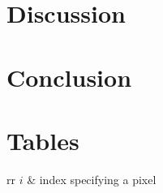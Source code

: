 \documentclass[iop,floatfix]{emulateapj}
\newcommand{\vt}{ {\bm \theta}}
\newcommand{\vg}{\vt_{\star, {\rm grid}}}
\newcommand{\vpp}{\vt_{\star, {\rm post}}}
\newcommand{\finst}{f_{\lambda, {\rm inst}}}
\newcommand{\fsynth}{f_{\lambda, {\rm synth}}}
\newcommand{\vN}{\vt_{\rm N}}
\newcommand{\vtstar}{\vt_{\star}}
\newcommand{\vtcheb}{\vt_{\rm Cheb}}
\newcommand{\vtorder}[1]{\vt_{{\rm order}_{#1}}}
\newcommand{\vtorders}{\vt_{\rm orders}}
\newcommand{\vtline}[1]{\vt_{{\rm line}_{#1}}}
\newcommand{\vtlines}{\vt_{\rm lines}}
\newcommand{\fD}{ \vec{{\bm D}}}
\newcommand{\fDi}{D_i}
\newcommand{\Z}{[{\rm Fe}/{\rm H}]}
\newcommand{\A}{[\alpha/{\rm Fe}]}
\begin{document}
\section{Discussion}
\label{sec:discussion}

\section{Conclusion}
\label{sec:conclusion}




\section{Tables}

\begin{deluxetable}{rr}
\startdata
$i$ & index specifying a pixel\\

\end{deluxetable}
\end{document}
